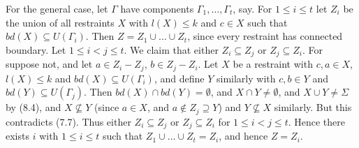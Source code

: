 For the general case, let $\Gamma$ have components $\Gamma_1, \dots, \Gamma_t$, say. For $1 \le i \le t$ let $Z_i$ be the union of all restraints $X$ with $l(X) \le k$ and $c \in X$ such that $bd(X) \subseteq U(\Gamma_i)$. Then $Z = Z_1 \cup \dots \cup Z_t$, since every restraint has connected boundary. Let $1 \le i < j \le t$. We claim that either $Z_i \subseteq Z_j$ or $Z_j \subseteq Z_i$. For suppose not, and let $a \in Z_i - Z_j$, $b \in Z_j - Z_i$. Let $X$ be a restraint with $c, a \in X$, $l(X) \le k$ and $bd(X) \subseteq U(\Gamma_i)$, and define $Y$ similarly with $c, b \in Y$ and $bd(Y) \subseteq U(\Gamma_j)$. Then $bd(X) \cap bd(Y) = \emptyset$, and $X \cap Y \ne \emptyset$, and $X \cup Y \ne \Sigma$ by (8.4), and $X \nsubseteq Y$ (since $a \in X$, and $a \notin Z_j \supseteq Y$) and $Y \nsubseteq X$ similarly. But this contradicts (7.7). Thus either $Z_i \subseteq Z_j$ or $Z_j \subseteq Z_i$ for $1 \le i < j \le t$. Hence there exists $i$ with $1 \le i \le t$ such that $Z_1 \cup \dots \cup Z_t = Z_i$, and hence $Z = Z_i$.

